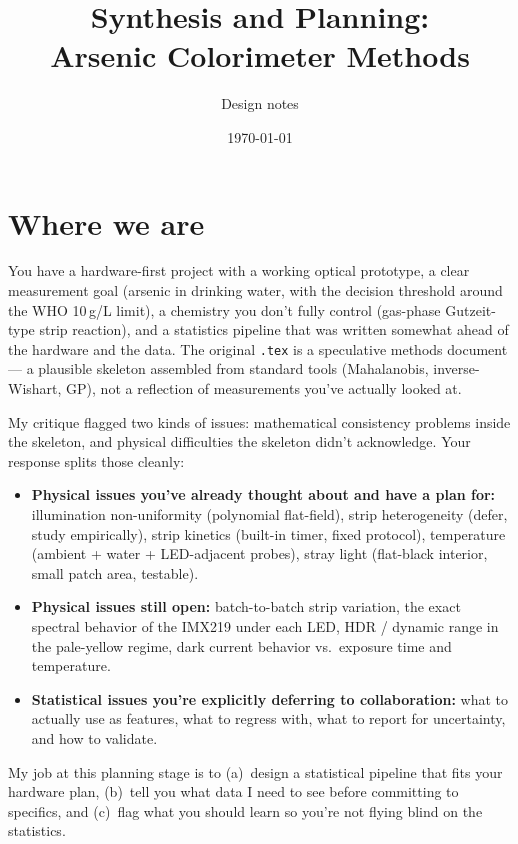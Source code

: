 \documentclass[11pt,letterpaper]{article}
\title{Synthesis and Planning:\\ Arsenic Colorimeter Methods}
\author{Design notes}
\date{\today}
\begin{document}
\maketitle

\section*{Where we are}

You have a hardware-first project with a working optical prototype, a clear
measurement goal (arsenic in drinking water, with the decision threshold
around the WHO 10\,\textmu g/L limit), a chemistry you don't fully control
(gas-phase Gutzeit-type strip reaction), and a statistics pipeline that was
written somewhat ahead of the hardware and the data. The original \texttt{.tex}
is a speculative methods document --- a plausible skeleton assembled from
standard tools (Mahalanobis, inverse-Wishart, GP), not a reflection of
measurements you've actually looked at.

My critique flagged two kinds of issues: mathematical consistency problems
inside the skeleton, and physical difficulties the skeleton didn't
acknowledge. Your response splits those cleanly:

\begin{itemize}
  \item \textbf{Physical issues you've already thought about and have a plan for:}
    illumination non-uniformity (polynomial flat-field), strip heterogeneity
    (defer, study empirically), strip kinetics (built-in timer, fixed
    protocol), temperature (ambient + water + LED-adjacent probes), stray
    light (flat-black interior, small patch area, testable).
  \item \textbf{Physical issues still open:} batch-to-batch strip variation,
    the exact spectral behavior of the IMX219 under each LED, HDR / dynamic
    range in the pale-yellow regime, dark current behavior vs.\ exposure
    time and temperature.
  \item \textbf{Statistical issues you're explicitly deferring to
    collaboration:} what to actually use as features, what to regress with,
    what to report for uncertainty, and how to validate.
\end{itemize}

My job at this planning stage is to (a)~design a statistical pipeline that
fits your hardware plan, (b)~tell you what data I need to see before
committing to specifics, and (c)~flag what you should learn so you're not
flying blind on the statistics.
\end{document}
